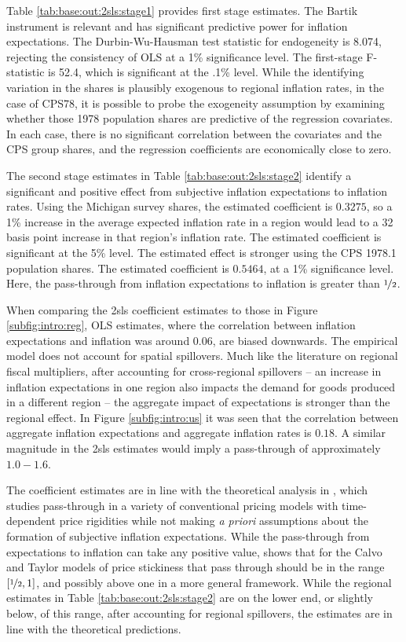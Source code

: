 \documentclass[12pt]{article}
\begin{document}
Table \ref{tab:base:out:2sls:stage1} provides first stage estimates. The Bartik instrument is relevant and has significant predictive power for inflation expectations. The Durbin-Wu-Hausman test statistic for endogeneity is 8.074, rejecting the consistency of OLS at a 1\% significance level. The first-stage F-statistic is 52.4, which is significant at the .1\% level. While the identifying variation in the shares is plausibly exogenous to regional inflation rates, in the case of CPS78, it is possible to probe the exogeneity assumption by examining whether those 1978 population shares are predictive of the regression covariates. In each case, there is no significant correlation between the covariates and the CPS group shares, and the regression coefficients are economically close to zero.

The second stage estimates in Table \ref{tab:base:out:2sls:stage2} identify a significant and positive effect from subjective inflation expectations to inflation rates. Using the Michigan survey shares, the estimated coefficient is $0.3275$, so a 1\% increase in the average expected inflation rate in a region would lead to a 32 basis point increase in that region's inflation rate. The estimated coefficient is significant at the 5\% level. The estimated effect is stronger using the CPS 1978.1 population shares. The estimated coefficient is $0.5464$, at a 1\% significance level. Here, the pass-through from inflation expectations to inflation is greater than $\nicefrac{1}{2}$.  

When comparing the 2sls coefficient estimates to those in Figure \ref{subfig:intro:reg}, OLS estimates, where the correlation between inflation expectations and inflation was around $0.06$, are biased downwards. The empirical model does not account for spatial spillovers. Much like the literature on regional fiscal multipliers, after accounting for cross-regional spillovers -- an increase in inflation expectations in one region also impacts the demand for goods produced in a different region -- the aggregate impact of expectations is stronger than the regional effect. In Figure \ref{subfig:intro:us} it was seen that the correlation between aggregate inflation expectations and aggregate inflation rates is $0.18$. A similar magnitude in the 2sls estimates would imply a pass-through of approximately $1.0-1.6$.  

The coefficient estimates are in line with the theoretical analysis in \cite{Werning:expectsWP}, which studies pass-through in a variety of conventional pricing models with time-dependent price rigidities while not making \emph{a priori} assumptions about the formation of subjective inflation expectations. While the pass-through from expectations to inflation can take any positive value, \cite{Werning:expectsWP} shows that for the Calvo and Taylor models of price stickiness that pass through should be in the range $\left[\nicefrac{1}{2},1\right]$, and possibly above one in a more general framework. While the regional estimates in Table \ref{tab:base:out:2sls:stage2} are on the lower end, or slightly below, of this range, after accounting for regional spillovers, the estimates are in line with the theoretical predictions.
\end{document}
